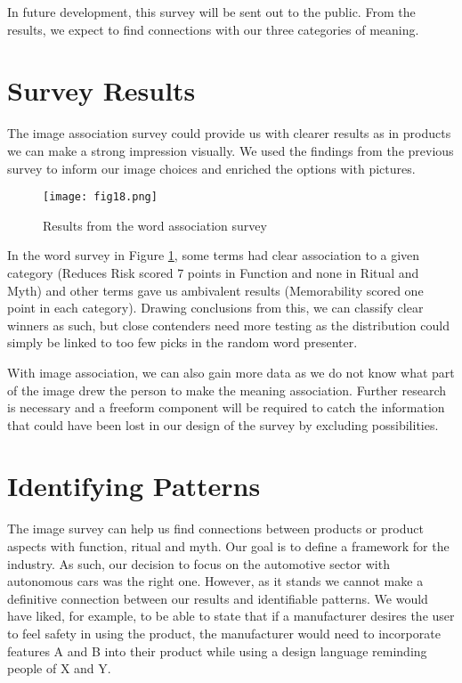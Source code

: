 \documentclass[12pt, usenames, dvipsnames]{report}
\begin{document}
\begin{flushleft}
In future development, this survey will be sent out to the public.
From the results, we expect to find connections with our three categories of meaning.


\section{Survey Results}

The image association survey could provide us with clearer results as in products we can make a strong impression visually.
We used the findings from the previous survey to inform our image choices and enriched the options with pictures.

\vspace*{1.2em}
\begin{figure}[!htbp]
  \hspace*{-3.666em}
  \texttt{[image: fig18.png]}
  \caption{Results from the word association survey}
  \label{fig:figure18}
\end{figure}
\vspace*{1.2em} 

In the word survey in Figure \ref{fig:figure18}, some terms had clear association to a given category (Reduces Risk scored 7 points in Function and none in Ritual and Myth) and other terms gave us ambivalent results (Memorability scored one point in each category).
Drawing conclusions from this, we can classify clear winners as such, but close contenders need more testing as the distribution could simply be linked to too few picks in the random word presenter.

With image association, we can also gain more data as we do not know what part of the image drew the person to make the meaning association. 
Further research is necessary and a freeform component will be required to catch the information that could have been lost in our design of the survey by excluding possibilities.


\section{Identifying Patterns}

The image survey can help us find connections between products or product aspects with function, ritual and myth.
Our goal is to define a framework for the industry. 
As such, our decision to focus on the automotive sector with autonomous cars was the right one. 
However, as it stands we cannot make a definitive connection between our results and identifiable patterns.
We would have liked, for example, to be able to state that if a manufacturer desires the user to feel safety in using the product, the manufacturer would need to incorporate features A and B into their product while using a design language reminding people of X and Y.


\end{flushleft}
\end{document}
